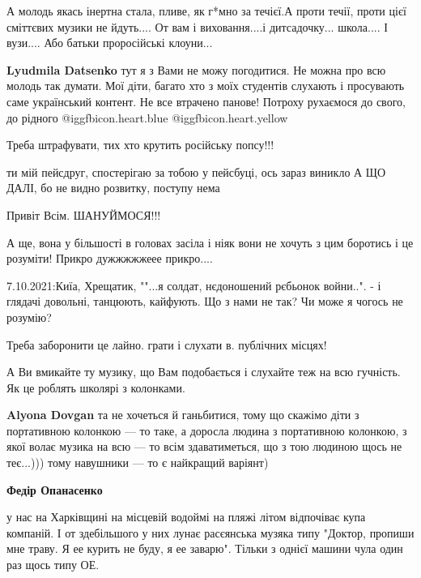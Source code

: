 \begin{itemize}
А молодь якась інертна стала, пливе, як г*мно за течієї.А проти течії, проти цієї сміттєвих музики не йдуть....
От вам і виховання....і дитсадочку... школа.... І вузи.... Або батьки проросійські клоуни...

\begin{itemize} %
\textbf{Lyudmila Datsenko} тут я з Вами не можу погодитися. Не можна про всю молодь так думати. Мої діти, багато хто з моїх студентів слухають і просувають саме український контент. Не все втрачено панове! Потроху рухаємося до свого, до рідного  @igg{fbicon.heart.blue}  @igg{fbicon.heart.yellow} 
\end{itemize} %

Треба штрафувати, тих хто крутить російську попсу!!!

ти мій пейсдруг, спостерігаю за тобою у пейсбуці, ось зараз виникло А ЩО ДАЛІ, бо не видно розвитку, поступу нема

Привіт Всім. ШАНУЙМОСЯ!!!

А ще, вона у більшості в головах засіла і ніяк вони не хочуть з цим боротись і це розуміти! Прикро дужжжжжеее прикро....

7.10.2021:Киїа, Хрещатик, ""...я солдат, нєдоношений рєбьонок войни..". - і глядачі довольні, танцюють, кайфують. Що з нами не так? Чи може я чогось не розумію?

Треба заборонити це лайно. грати і слухати в. публічних місцях!


А Ви вмикайте ту музику, що Вам подобається і слухайте теж на всю гучність. Як
це роблять школярі з колонками.

\begin{itemize} %
\textbf{Alyona Dovgan} та не хочеться й ганьбитися, тому що скажімо діти з
портативною колонкою — то таке, а доросла людина з портативною колонкою, з якої
волає музика на всю — то всім здаватиметься, що з тою людиною щось не теє...)))
тому навушники — то є найкращий варіянт)

\textbf{Федір Опанасенко} 

у нас на Харківщині на місцевій водоймі на пляжі літом відпочіває купа
компаній. І от здебільшого у них лунає расєянська музяка типу "Доктор, пропиши
мне траву. Я ее курить не буду, я ее заварю". Тільки з однієї машини чула один
раз щось типу ОЕ.


\end{itemize}
\end{itemize}

